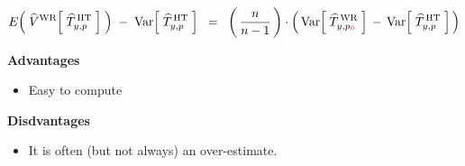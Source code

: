\vskip 0.5cm
\begin{proposition}
\begin{equation*}
E\!\left(\;\widehat{V}^{\textnormal{WR}}\!\left[\;\widehat{T}^{\,\textnormal{HT}}_{y,p}\;\right]\;\right)
\; - \; \textnormal{Var}\!\left[\;\widehat{T}^{\,\textnormal{HT}}_{y,p}\;\right]
\;\; = \;\;
	\left(\,\dfrac{n}{n-1}\,\right)
	\cdot
	\left(\,
		\textnormal{Var}\!\left[\;\widehat{T}^{\,\textnormal{WR}}_{y,p_{\color{red}0}}\;\right]
		\, - \,
		\textnormal{Var}\!\left[\;\widehat{T}^{\,\textnormal{HT}}_{y,p}\;\right]
		\,\right)
\end{equation*}
\end{proposition}


\vskip 0.5cm
\noindent
\textbf{Advantages}
\begin{itemize}
\item
	Easy to compute
\end{itemize}

\vskip 0.5cm
\noindent
\textbf{Disdvantages}
\begin{itemize}
\item
	It is often (but not always) an over-estimate.
\end{itemize}

